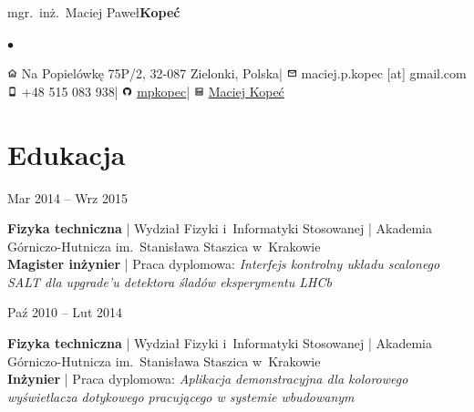 \documentclass[11pt,a4paper,sans]{article}
\newcommand{\twhorline}[1]{\noindent\makebox[\linewidth]{\rule{\textwidth}{#1}}}
\newcommand{\cvedudateitem}[6]{

	\noindent
	\begin{minipage}[t]{0.22\linewidth}
		#1
	\end{minipage}
	\hfill
	\begin{minipage}[t]{0.76\linewidth}
		{\bfseries #2} | #3 | #4\\
		\textbf{#5} | Praca dyplomowa: \emph{#6}
	\end{minipage}
	\vspace{1\baselineskip}

}
\newcommand{\firstname}{Maciej Paweł}
\newcommand{\familyname}{Kopeć}
\newcommand{\address}{Na Popielówkę 75P/2, 32-087 Zielonki, Polska}
\newcommand{\mobile}{+48 515 083 938}
\newcommand{\email}{maciej.p.kopec [at] gmail.com}
\newcommand{\github}{\href{https://github.com/mpkopec}{mpkopec}}
\newcommand{\linkedin}{\href{https://www.linkedin.com/in/maciej-kope\%C4\%87-46735595/}{Maciej Kopeć}}
\begin{document}
	\begin{center}
		{\Huge mgr.~inż.~\firstname \space \bfseries \familyname \normalfont}
		\vspace{1\baselineskip}

		\large
		\renewcommand*{\do}[1]{$\bullet$ #1 }
		$\bullet$
		\vspace{0.2\baselineskip}
		\twhorline{1pt}

		\vspace{0.25\baselineskip}
		\includegraphics[height=0.8em]{img/icons8-home-96.png}
		\address \space |
		\includegraphics[height=0.8em]{img/icons8-envelope-96.png}
		\email \\

		\includegraphics[height=0.8em]{img/icons8-iphone-96.png}
		\mobile \space |
		\includegraphics[height=0.8em]{img/icons8-github-96.png}
		\github \space |
		\includegraphics[height=0.8em]{img/icons8-linkedin-96.png}
		\linkedin

		\twhorline{1pt}

	\end{center}

	\section{Edukacja}
	\cvedudateitem
		{Mar 2014 -- Wrz 2015}
		{Fizyka techniczna}
		{Wydział Fizyki i~Informatyki Stosowanej}
		{Akademia Górniczo-Hutnicza im.~Stanisława Staszica w~Krakowie}
		{Magister inżynier}
		{Interfejs kontrolny układu scalonego SALT dla upgrade'u detektora śladów eksperymentu LHCb}
	\cvedudateitem
		{Paź 2010 -- Lut 2014}
		{Fizyka techniczna}
		{Wydział Fizyki i~Informatyki Stosowanej}
		{Akademia Górniczo-Hutnicza im.~Stanisława Staszica w~Krakowie}
		{Inżynier}
		{Aplikacja demonstracyjna dla kolorowego wyświetlacza dotykowego pracującego w systemie wbudowanym}
\end{document}
